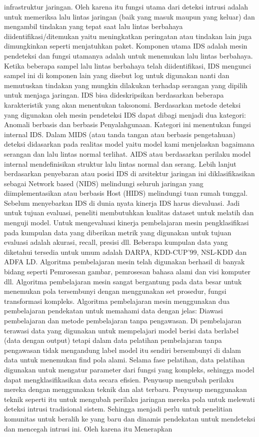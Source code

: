 \documentclass[conference]{IEEEtran}
\begin{document}
infrastruktur jaringan\cite{masoodi2019symmetricpage79}. Oleh karena itu fungsi utama dari deteksi intrusi adalah untuk memeriksa lalu lintas jaringan (baik yang masuk maupun yang keluar) dan mengambil tindakan yang tepat saat lalu lintas berbahaya diidentifikasi/ditemukan yaitu meningkatkan peringatan atau tindakan lain juga dimungkinkan seperti menjatuhkan paket. Komponen utama IDS adalah mesin pendeteksi dan fungsi utamanya adalah untuk menemukan lalu lintas berbahaya. Ketika beberapa sampel lalu lintas berbahaya telah diidentifikasi, IDS mengunci sampel ini di komponen lain yang disebut log untuk digunakan nanti dan memutuskan tindakan yang mungkin dilakukan terhadap serangan yang dipilih untuk menjaga jaringan. IDS bisa dideskripsikan berdasarkan beberapa karakteristik yang akan menentukan taksonomi. Berdasarkan metode deteksi yang digunakan oleh mesin pendeteksi IDS dapat dibagi menjadi dua kategori\cite{ashoor2011difference}: Anomali berbasis dan berbasis Penyalahgunaan. Kategori ini menentukan fungsi internal IDS. Dalam MIDS (atau tanda tangan atau berbasis pengetahuan) deteksi didasarkan pada realitas model yaitu model kami menjelaskan bagaimana serangan dan lalu lintas normal terlihat. AIDS atau berdasarkan perilaku model internal mendefinisikan struktur lalu lintas normal dan serang. Lebih lanjut berdasarkan penyebaran atau posisi IDS di arsitektur jaringan ini diklasifikasikan sebagai Network based (NIDS) melindungi seluruh jaringan yang diimplementasikan atau berbasis Host (HIDS) melindungi tuan rumah tunggal. Sebelum menyebarkan IDS di dunia nyata kinerja IDS harus dievaluasi. Jadi untuk tujuan evaluasi, peneliti membutuhkan kualitas dataset untuk melatih dan menguji model. Untuk mengevaluasi kinerja pembelajaran mesin pengklasifikasi pada kumpulan data yang diberikan metrik yang digunakan untuk tujuan evaluasi adalah akurasi, recall, presisi dll. Beberapa kumpulan data yang diketahui tersedia untuk umum adalah DARPA, KDD-CUP'99, NSL-KDD dan ADFA LD. Algoritma pembelajaran mesin telah digunakan berhasil di banyak bidang seperti Pemrosesan gambar, pemrosesan bahasa alami dan visi komputer dll. Algoritma pembelajaran mesin sangat bergantung pada data besar untuk menemukan pola tersembunyi dengan menggunakan set prosedur, fungsi transformasi kompleks\cite{rajadurai2020stacked}\cite{thaseen2020network}. Algoritma pembelajaran mesin menggunakan dua pembelajaran pendekatan untuk memahami data dengan jelas: Diawasi pembelajaran dan metode pembelajaran tanpa pengawasan. Di pembelajaran terawasi data yang digunakan untuk mempelajari model berisi data berlabel (data dengan output) tetapi dalam data pelatihan pembelajaran tanpa pengawasan tidak mengandung label model itu sendiri bersembunyi di dalam data untuk menemukan find pola alami. Selama fase pelatihan, data pelatihan digunakan untuk mengatur parameter dari fungsi yang kompleks, sehingga model dapat mengklasifikasikan data secara efisien. Penyusup mengubah perilaku mereka dengan menggunakan teknik dan alat terbaru. Penyusup menggunakan teknik seperti itu untuk mengubah perilaku jaringan mereka pola untuk melewati deteksi intrusi tradisional sistem. Sehingga menjadi perlu untuk penelitian komunitas untuk beralih ke yang baru dan dinamis pendekatan untuk mendeteksi dan mencegah intrusi ini. Oleh karena itu Menerapkan 
\end{document}
